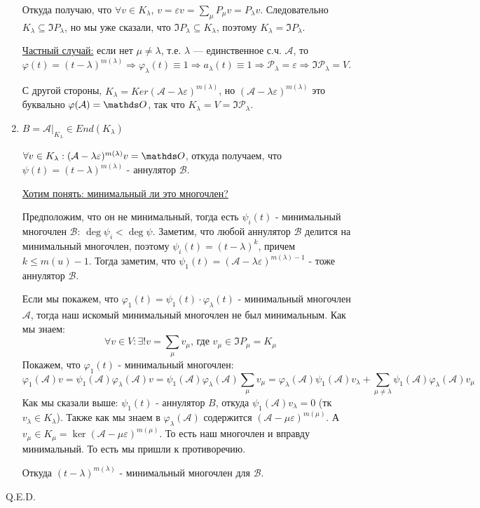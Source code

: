 \begin{enumerate}
    Откуда получаю, что $\forall v \in K_{\lambda}, \, v= \varepsilon v = \sum\limits_{\mu}P_{\mu}v=P_{\lambda}v$. Следовательно $ K_{\lambda }\subseteq \Im P_{\lambda}$, но мы уже сказали, что  $ \Im P_{\lambda} \subseteq K_{\lambda}$, поэтому $ K_{\lambda }= \Im P_{\lambda}$.

    \uline{Частный случай:} если нет $\mu \ne \lambda$, т.е. $\lambda$ --- единственное с.ч. $\mathcal{A}$, то $\varphi(t) = (t - \lambda)^{m(\lambda)} \Rightarrow \varphi_{\lambda}(t) \equiv 1 \Rightarrow a_{\lambda}(t) \equiv 1 \Rightarrow \mathcal{P}_{\lambda} = \varepsilon \Rightarrow \Im\mathcal{P}_{\lambda} = V$.

    С другой стороны, $K_{\lambda} = Ker(\mathcal{A} - \lambda\varepsilon)^{m(\lambda)}$, но $(\mathcal{A} - \lambda\varepsilon)^{m(\lambda)}$ это буквально $\varphi(\mathcal{A}) = \zero$, так что $K_{\lambda} = V = \Im\mathcal{P}_{\lambda}$.
    

    \item $B = \mathcal{A}\Big|_{K_{\lambda}}\in End(K_{\lambda})$
    
    $\forall v \in K_{\lambda}:(\mathcal{A}-\lambda \varepsilon)^{m(\lambda)}v = \zero$, откуда получаем, что $\psi(t) = (t-\lambda)^{m(\lambda)}$ - аннулятор $\mathcal{B}$. 

    \uline{Хотим понять: минимальный ли это многочлен?} 
    
    Предположим, что он не минимальный, тогда есть $\psi_i(t)$ - минимальный многочлен $\mathcal{B}$: $\deg \psi_i <\deg \psi$. Заметим, что любой аннулятор $\mathcal{B}$ делится на минимальный многочлен, поэтому $\psi_i(t) =(t-\lambda )^{k}$, причем $k \leq m(u)-1$. Тогда заметим, что $\psi_1(t) = (\mathcal{A}-\lambda \varepsilon)^{m(\lambda)-1}$ - тоже аннулятор $\mathcal{B}$. 

    Если мы покажем, что $\varphi_1(t)=\psi_1(t)\cdot \varphi_{\lambda}(t)$ - минимальный многочлен $\mathcal{A}$, тогда наш искомый минимальный многочлен не был минимальным. Как мы знаем:
    $$\forall v \in V: \exists! v =\sum\limits_{\mu} v_{\mu}\text{, где }v_{\mu}\in \Im P_\mu =  K_\mu$$
    Покажем, что $\varphi_1(t)$ - минимальный многочлен:
$$\varphi_1(\mathcal{A})v=\psi_1(\mathcal{A}) \varphi_{\lambda}(\mathcal{A})v = \psi_1(\mathcal{A}) \varphi_{\lambda}(\mathcal{A})\sum\limits_{\mu} v_{\mu} = \varphi_{\lambda}(\mathcal{A})\psi_1(\mathcal{A})v_\lambda + \sum\limits_{\mu\neq \lambda}\psi_1(\mathcal{A}) \varphi_{\lambda}(\mathcal{A}) v_{\mu}$$
Как мы сказали выше: $\psi_1(t)$ - аннулятор $B$, откуда $\psi_1(\mathcal{A})v_{\lambda} = 0$ (тк $v_\lambda \in K_\lambda$). Также как мы знаем в $\varphi_\lambda(\mathcal{A})$ содержится $(\mathcal{A}-\mu\varepsilon)^{m(\mu)}$. А $v_{\mu} \in K_{\mu} = \ker (\mathcal{A}-\mu\varepsilon)^{m(\mu)}$. То есть наш многочлен и вправду минимальный. То есть мы пришли к противоречию. 

Откуда $(t-\lambda)^{m(\lambda)}$ - минимальный многочлен для $\mathcal{B}$.
    
\end{enumerate}
 \hfill Q.E.D.

